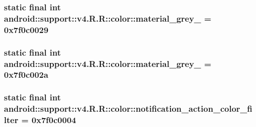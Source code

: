 \hypertarget{classandroid_1_1support_1_1v4_1_1_r_1_1color_fa8bcefefa3579981c1658e1db4e37d6}{
\subsubsection[{material\_\-grey\_\-850}]{\setlength{\rightskip}{0pt plus 5cm}static final int android::support::v4.R.R::color::material\_\-grey\_ = 0x7f0c0029}}
\label{classandroid_1_1support_1_1v4_1_1_r_1_1color_fa8bcefefa3579981c1658e1db4e37d6}


\hypertarget{classandroid_1_1support_1_1v4_1_1_r_1_1color_1520c27513d7990c0568d2fb8b79da86}{
\subsubsection[{material\_\-grey\_\-900}]{\setlength{\rightskip}{0pt plus 5cm}static final int android::support::v4.R.R::color::material\_\-grey\_ = 0x7f0c002a}}
\label{classandroid_1_1support_1_1v4_1_1_r_1_1color_1520c27513d7990c0568d2fb8b79da86}


\hypertarget{classandroid_1_1support_1_1v4_1_1_r_1_1color_57d3179b8e011fff2940a9e09dfd0ba6}{
\subsubsection[{notification\_\-action\_\-color\_\-filter}]{\setlength{\rightskip}{0pt plus 5cm}static final int android::support::v4.R.R::color::notification\_\-action\_\-color\_\-filter = 0x7f0c0004}}
\label{classandroid_1_1support_1_1v4_1_1_r_1_1color_57d3179b8e011fff2940a9e09dfd0ba6}


